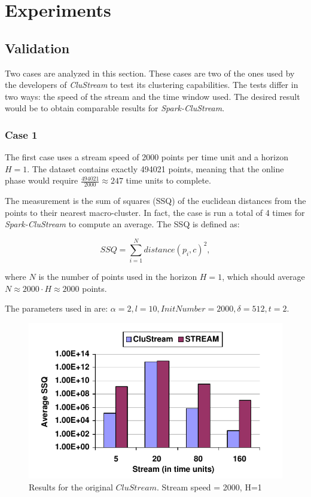 \documentclass[10pt, conference, compsocconf]{IEEEtran}
\begin{document}
\section{Experiments}

\subsection{Validation}


Two cases are analyzed in this section. These cases are two of the ones used by the developers of \textit{CluStream} to test its clustering capabilities. The tests differ in two ways: the speed of the stream and the time window used. The desired result would be to obtain comparable results for \textit{Spark-CluStream}.

\subsubsection{Case 1}

The first case uses a stream speed of 2000 points per time unit and a horizon $H=1$. The dataset contains exactly 494021 points, meaning that the online phase would require $\frac{494021}{2000} \approx 247$ time units to complete.

The measurement is the sum of squares (SSQ) of the euclidean distances from the points to their nearest macro-cluster. In fact, the case is run a total of 4 times for \textit{Spark-CluStream} to compute an average. The SSQ is defined as:

\begin{equation}
 SSQ = \sum_{i=1}^N distance(p_i,c)^2,
\end{equation}

where $N$ is the number of points used in the horizon $H=1$, which should average $N \approx 2000\cdot H \approx 2000$ points.

The parameters used in \cite{clustreamOrig} are: $\alpha=2,l=10,InitNumber=2000,\delta=512,t=2$.

\begin{figure}[h]
 \centering
 \includegraphics[scale=0.55]{./styles/2000h1-orig.png}
 \caption{Results for the original $CluStream$\cite{clustreamOrig}. Stream speed = 2000, H=1}
 \label{fig:2000orig}
\end{figure}
\end{document}
